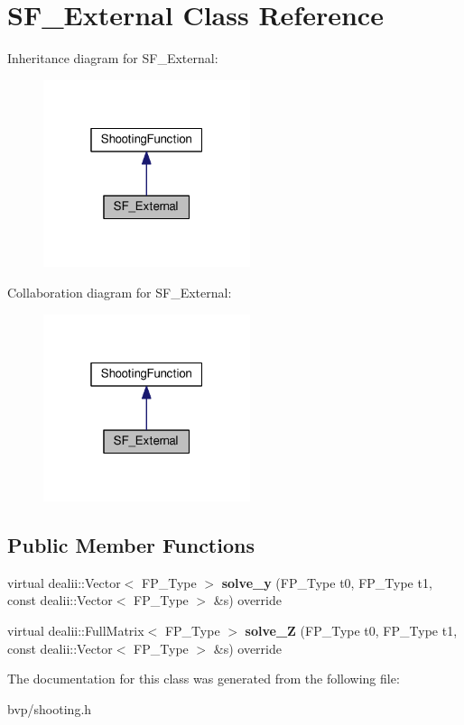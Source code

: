 \hypertarget{classSF__External}{}\section{S\+F\+\_\+\+External Class Reference}
\label{classSF__External}


Inheritance diagram for S\+F\+\_\+\+External\+:
\nopagebreak
\begin{figure}[H]
\begin{center}
\leavevmode
\includegraphics[width=172pt]{classSF__External__inherit__graph}
\end{center}
\end{figure}


Collaboration diagram for S\+F\+\_\+\+External\+:
\nopagebreak
\begin{figure}[H]
\begin{center}
\leavevmode
\includegraphics[width=172pt]{classSF__External__coll__graph}
\end{center}
\end{figure}
\subsection*{Public Member Functions}
\begin{DoxyCompactItemize}
\item 
\mbox{\label{classSF__External_ab156d1b3064f97dfafb2b94f6a86dd88}} 
virtual dealii\+::\+Vector$<$ F\+P\+\_\+\+Type $>$ {\bfseries solve\+\_\+y} (F\+P\+\_\+\+Type t0, F\+P\+\_\+\+Type t1, const dealii\+::\+Vector$<$ F\+P\+\_\+\+Type $>$ \&s) override
\item 
\mbox{\label{classSF__External_aa200b549afa92b96cd50b4adf3635f06}} 
virtual dealii\+::\+Full\+Matrix$<$ F\+P\+\_\+\+Type $>$ {\bfseries solve\+\_\+Z} (F\+P\+\_\+\+Type t0, F\+P\+\_\+\+Type t1, const dealii\+::\+Vector$<$ F\+P\+\_\+\+Type $>$ \&s) override
\end{DoxyCompactItemize}


The documentation for this class was generated from the following file\+:\begin{DoxyCompactItemize}
\item 
bvp/shooting.\+h\end{DoxyCompactItemize}

